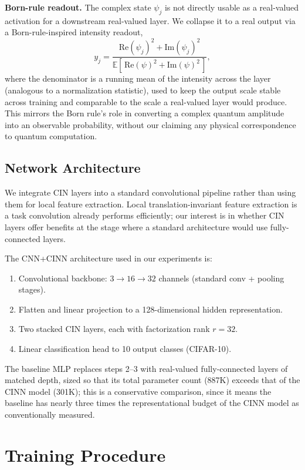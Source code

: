 \documentclass[11pt]{article}
\begin{document}
\textbf{Born-rule readout.} The complex state $\psi_j$ is not directly usable as a real-valued activation for a downstream real-valued layer. We collapse it to a real output via a Born-rule-inspired intensity readout,
\begin{equation}
    y_j = \frac{\text{Re}(\psi_j)^2 + \text{Im}(\psi_j)^2}{\mathbb{E}[\, \text{Re}(\psi)^2 + \text{Im}(\psi)^2 \,]},
    \label{eq:born}
\end{equation}
where the denominator is a running mean of the intensity across the layer (analogous to a normalization statistic), used to keep the output scale stable across training and comparable to the scale a real-valued layer would produce. This mirrors the Born rule's role in converting a complex quantum amplitude into an observable probability, without our claiming any physical correspondence to quantum computation.

\subsection{Network Architecture}
We integrate CIN layers into a standard convolutional pipeline rather than using them for local feature extraction. Local translation-invariant feature extraction is a task convolution already performs efficiently; our interest is in whether CIN layers offer benefits at the stage where a standard architecture would use fully-connected layers.

The CNN+CINN architecture used in our experiments is:
\begin{enumerate}
    \item Convolutional backbone: $3 \to 16 \to 32$ channels (standard conv + pooling stages).
    \item Flatten and linear projection to a 128-dimensional hidden representation.
    \item Two stacked CIN layers, each with factorization rank $r = 32$.
    \item Linear classification head to 10 output classes (CIFAR-10).
\end{enumerate}
The baseline MLP replaces steps 2--3 with real-valued fully-connected layers of matched depth, sized so that its total parameter count (887K) exceeds that of the CINN model (301K); this is a conservative comparison, since it means the baseline has nearly three times the representational budget of the CINN model as conventionally measured.

\section{Training Procedure}
\label{sec:training}
\end{document}
